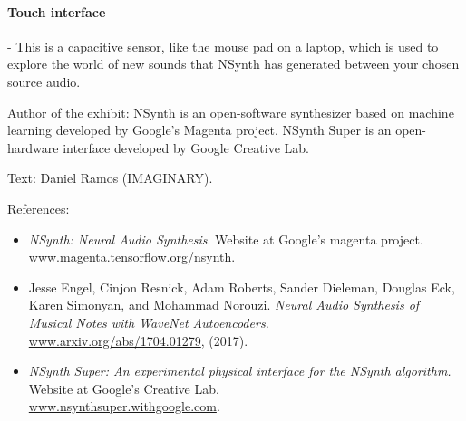 \paragraph{Touch interface} - This is a capacitive sensor, like the mouse pad on a laptop, which is used to explore the world of new sounds that NSynth has generated between your chosen source audio.

\begin{sectcredits}

\item[Author of the exhibit:] NSynth is an open-software synthesizer based on machine learning developed by Google's Magenta project. NSynth Super is an open-hardware interface developed by Google Creative Lab.

\item[Text:] Daniel Ramos (IMAGINARY).

\item[References:] \strut
\noindent \begin{itemize}[leftmargin=*]

\item \emph{NSynth: Neural Audio Synthesis}. Website at Google's magenta project. \\
\url{www.magenta.tensorflow.org/nsynth}.

\item Jesse Engel, Cinjon Resnick, Adam Roberts, Sander Dieleman, Douglas Eck, Karen Simonyan, and Mohammad Norouzi. \emph{Neural Audio Synthesis of Musical Notes with WaveNet Autoencoders.} \\
\url{www.arxiv.org/abs/1704.01279}, (2017).

\item \emph{NSynth Super: An experimental physical interface for the NSynth algorithm.} Website at Google's Creative Lab.\\ \url{www.nsynthsuper.withgoogle.com}.
\end{itemize}
\end{sectcredits}
